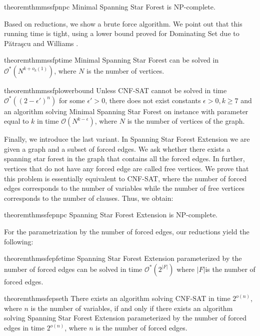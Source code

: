 \documentclass[en]{pracamgr}
\theoremstyle{definition}
\newcommand{\mssfp}{{\sc Minimal Spanning Star Forest}}
\newcommand{\ssfep}{{\sc Spanning Star Forest Extension}}
\newcommand{\domsetp}{{\sc Dominating Set}}
\newcommand{\cnfsat}{{\sc CNF-SAT}}
\begin{document}
\begin{restatable}{theorem}{thmmssfpnpc}\label{thm-mssfp-npc}
	\mssfp{} is \textup{NP-complete}.
\end{restatable}

\noindent
Based on reductions, we show a brute force algorithm. We point out that this running time is tight, using a lower bound proved for \domsetp{} due to Pătraşcu and Williams \cite{DomSet}. 

\begin{restatable}{theorem}{thmmssfptime}\label{thm-mssfp-time}
	\mssfp{} can be solved in $\mathcal{O}^*(N^{k + o_k(1)})$, where $N$ is the number of vertices.
\end{restatable}

\begin{restatable}{theorem}{thmmssfplowerbound}\label{thm-mssfp-lowerbound}
	Unless \cnfsat{} cannot be solved in time $\mathcal{O}^*((2-\epsilon')^n)$ for some $\epsilon' > 0$, there does not exist constants $\epsilon > 0,k\geq 7$ and an algorithm solving \mssfp{} on instance with parameter equal to $k$ in time $\mathcal{O}(N^{k-\epsilon})$, where $N$ is the number of vertices of the graph.
\end{restatable}

Finally, we introduce the last variant. In \ssfep{} we are given a graph and a subset of forced edges. We ask whether there exists a spanning star forest in the graph that contains all the forced edges. In further, vertices that do not have any forced edge are called free vertices. We prove that this problem is essentially equivalent to \cnfsat{}, where the number of forced edges corresponds to the number of variables while the number of free vertices corresponds to the number of clauses. Thus, we obtain:

\begin{restatable}{theorem}{thmssfepnpc}\label{thm-ssfep-npc}
	\ssfep{} is \textup{NP}-complete.
\end{restatable}

\noindent
For the parametrization by the number of forced edges, our reductions yield the following:

\begin{restatable}{theorem}{thmssfepfetime}\label{thm-ssfep-fe-time}
	\ssfep{} parameterized by the number of forced edges can be solved in time $\mathcal{O}^*(2^{|F|})$ where $|F|$is the number of forced edges.
\end{restatable}

\begin{restatable}{theorem}{thmssfepseth}\label{thm-ssfep-seth}
	There exists an algorithm solving \cnfsat{} in time $2^{o(n)}$, where $n$ is the number of variables, if and only if there exists an algorithm solving \ssfep{} parameterized by the number of forced edges in time $2^{o(n)}$, where $n$ is the number of forced edges.
\end{restatable}
\end{document}
